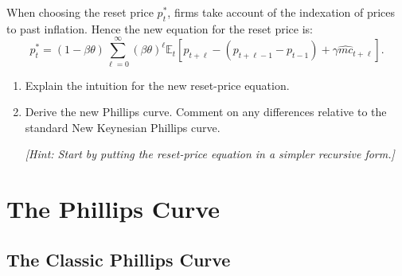 \documentclass[dvipsnames,11pt]{article}
\begin{document}
    \noindent When choosing the reset price $p^*_t$, firms take account of the indexation of prices to past inflation. Hence the new equation for the reset price is:
    \[
    p^*_t = (1 - \beta \theta) \sum_{\ell=0}^\infty (\beta \theta)^\ell \mathbb{E}_t [p_{t+\ell} - (p_{t+\ell-1} - p_{t-1}) +  \gamma \widehat{mc}_{t+\ell}].
    \]

    \begin{enumerate}[resume]

        \item Explain the intuition for the new reset-price equation.

            \begin{solution}

            
            
            \end{solution}

        \item Derive the new Phillips curve. Comment on any differences relative to the standard New Keynesian Phillips curve. 

            \textit{[Hint: Start by putting the reset-price equation in a simpler recursive form.]} 

            \begin{solution}

            
            
        \end{solution}

    \end{enumerate}





% 




\section{The Phillips Curve}

    \subsection{The Classic Phillips Curve}
\end{document}
